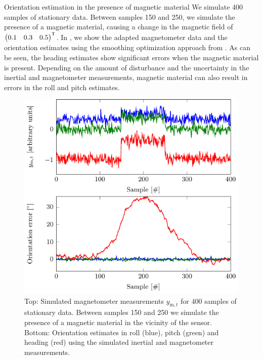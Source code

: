 \begin{myexample}{Orientation estimation in the presence of magnetic material}%
\label{ex:oriEst-magDist}%
We simulate 400 samples of stationary data. Between samples 150 and 250, we simulate the presence of a magnetic material, causing a change in the magnetic field of $\begin{pmatrix} 0.1 & 0.3 & 0.5 \end{pmatrix}^{\mathsf{T}}$. In , we show the adapted magnetometer data and the orientation estimates using the smoothing optimization approach from . As can be seen, the heading estimates show significant errors when the magnetic material is present. Depending on the amount of disturbance and the uncertainty in the inertial and magnetometer measurements, magnetic material can also result in errors in the roll and pitch estimates. 

\begin{figure}[t]
	\centering
	\includegraphics[scale = 1]{figure4_7.pdf}
    	\caption{Top: Simulated magnetometer measurements $y_{\text{m},t}$ for $400$ samples of stationary data. Between samples 150 and 250 we simulate the presence of a magnetic material in the vicinity of the sensor. Bottom: Orientation estimates in roll (blue), pitch (green) and heading (red) using the simulated inertial and magnetometer measurements.}
	\label{fig:oriEst-magDist}
\end{figure}
\end{myexample}

